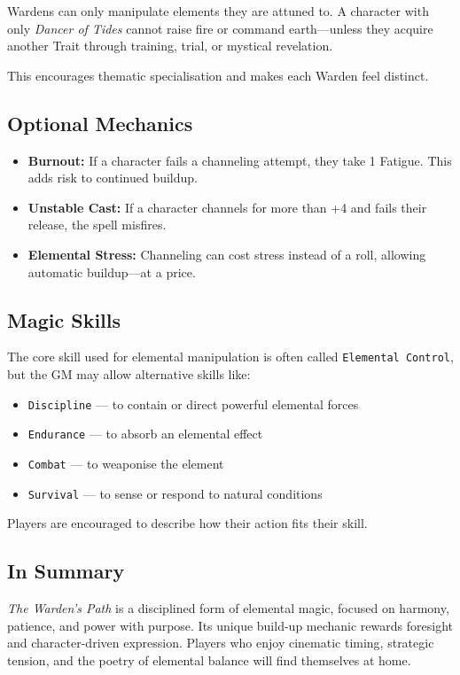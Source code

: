 Wardens can only manipulate elements they are attuned to. A character with only \textit{Dancer of Tides} cannot raise fire or command earth—unless they acquire another Trait through training, trial, or mystical revelation.

This encourages thematic specialisation and makes each Warden feel distinct.

\subsection{Optional Mechanics}

\begin{itemize}
    \item \textbf{Burnout:} If a character fails a channeling attempt, they take 1 Fatigue. This adds risk to continued buildup.
    \item \textbf{Unstable Cast:} If a character channels for more than +4 and fails their release, the spell misfires.
    \item \textbf{Elemental Stress:} Channeling can cost stress instead of a roll, allowing automatic buildup—at a price.
\end{itemize}

\subsection{Magic Skills}

The core skill used for elemental manipulation is often called \texttt{Elemental Control}, but the GM may allow alternative skills like:

\begin{itemize}
    \item \texttt{Discipline} — to contain or direct powerful elemental forces  
    \item \texttt{Endurance} — to absorb an elemental effect  
    \item \texttt{Combat} — to weaponise the element  
    \item \texttt{Survival} — to sense or respond to natural conditions  
\end{itemize}

Players are encouraged to describe how their action fits their skill.

\subsection{In Summary}

\textit{The Warden’s Path} is a disciplined form of elemental magic, focused on harmony, patience, and power with purpose. Its unique build-up mechanic rewards foresight and character-driven expression. Players who enjoy cinematic timing, strategic tension, and the poetry of elemental balance will find themselves at home.
